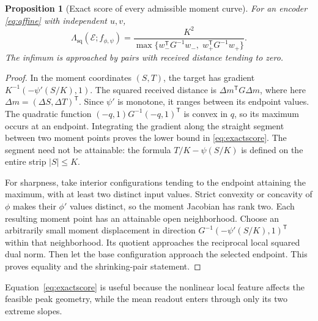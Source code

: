 \documentclass[11pt,letterpaper]{article}
\newtheorem{proposition}[theorem]{Proposition}
\theoremstyle{remark}
\newcommand{\enc}{\mathscr E}
\newcommand{\sq}{\mathrm{sq}}
\newcommand{\T}{\mathsf T}
\begin{document}
\begin{proposition}[Exact score of every admissible moment curve]
\label{prop:score}
For an encoder \eqref{eq:affine} with independent $u,v$,
\begin{equation}
 \Lambda_{\sq}(\enc;f_{\phi,\psi})
 =\frac{K^2}{\max\{w_-^\T G^{-1}w_-,\;w_+^\T G^{-1}w_+\}}.
 \label{eq:exactscore}
\end{equation}
The infimum is approached by pairs with received distance tending to zero.
\end{proposition}
\begin{proof}
In the moment coordinates $(S,T)$, the target has gradient $K^{-1}(-\psi'(S/K),1)$. The squared received distance is $\Delta m^\T G\Delta m$, where here $\Delta m=(\Delta S,\Delta T)^\T$. Since $\psi'$ is monotone, it ranges between its endpoint values. The quadratic function $(-q,1)G^{-1}(-q,1)^\T$ is convex in $q$, so its maximum occurs at an endpoint. Integrating the gradient along the straight segment between two moment points proves the lower bound in \eqref{eq:exactscore}. The segment need not be attainable: the formula $T/K-\psi(S/K)$ is defined on the entire strip $|S|\le K$.

For sharpness, take interior configurations tending to the endpoint attaining the maximum, with at least two distinct input values. Strict convexity or concavity of $\phi$ makes their $\phi'$ values distinct, so the moment Jacobian has rank two. Each resulting moment point has an attainable open neighborhood. Choose an arbitrarily small moment displacement in direction $G^{-1}(-\psi'(S/K),1)^\T$ within that neighborhood. Its quotient approaches the reciprocal local squared dual norm. Then let the base configuration approach the selected endpoint. This proves equality and the shrinking-pair statement.
\end{proof}

Equation~\eqref{eq:exactscore} is useful because the nonlinear local feature affects the feasible peak geometry, while the mean readout enters through only its two extreme slopes.
\end{document}
